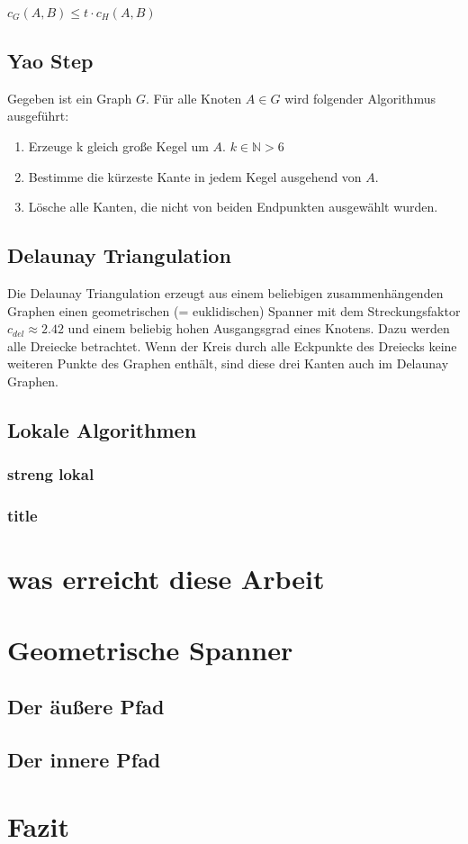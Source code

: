 \documentclass[a4paper,twoside]{IEEEtran}
\begin{document}
$c_G(A,B) \leq t \cdot c_H(A,B) $

\subsection{Yao Step}
Gegeben ist ein Graph $G $. Für alle Knoten $A \in G $ wird folgender Algorithmus ausgeführt:
\begin{enumerate}
\item Erzeuge k gleich große Kegel um $A $. $k \in \mathds{N} > 6 $
\item Bestimme die kürzeste Kante in jedem Kegel ausgehend von $A $.
\item Lösche alle Kanten, die nicht von beiden Endpunkten ausgewählt wurden.

\end{enumerate} 

\subsection{Delaunay Triangulation}
Die Delaunay Triangulation erzeugt aus einem beliebigen zusammenhängenden Graphen einen geometrischen (= euklidischen) Spanner mit dem Streckungsfaktor $c_{del} \approx 2.42 $ und einem beliebig hohen Ausgangsgrad eines Knotens. Dazu werden alle Dreiecke betrachtet. Wenn der Kreis durch alle Eckpunkte des Dreiecks keine weiteren Punkte des Graphen enthält, sind diese drei Kanten auch im Delaunay Graphen. 

\subsection{Lokale Algorithmen}
\subsubsection{streng lokal}
\subsubsection{title}


\section{was erreicht diese Arbeit} %

\section{Geometrische Spanner}
\subsection{Der äußere Pfad}
\subsection{Der innere Pfad}


\section{Fazit}





\end{document}
